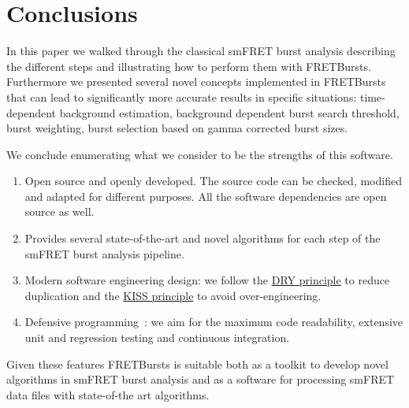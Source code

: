 \section{Conclusions}
\label{sec:conclusions}

In this paper we walked through the classical smFRET burst analysis describing
the different steps and illustrating how to perform them with FRETBursts.
Furthermore we presented several novel concepts implemented in FRETBursts that 
can lead to significantly more accurate results in specific situations: 
time-dependent background estimation, background dependent burst search threshold,
burst weighting, burst selection based on gamma corrected burst sizes. 

We conclude enumerating what we consider to be the strengths
of this software.

\begin{enumerate}
\item Open source and openly developed. The source code can be checked, modified and
adapted for different purposes. All the software dependencies are open source as well.
\item Provides several state-of-the-art and novel algorithms for each step of the 
smFRET burst analysis pipeline. 
\item Modern software engineering design: we follow the \href{http://en.wikipedia.org/wiki/Don\%27t_repeat_yourself}{DRY principle} to reduce duplication and the \href{http://en.wikipedia.org/wiki/KISS_principle}{KISS principle} to avoid over-engineering.
\item Defensive programming~\cite{Prli__2012}: we aim for the maximum code readability,
extensive unit and regression testing and continuous integration.
\end{enumerate}

Given these features FRETBursts is suitable both as a toolkit to develop novel algorithms
in smFRET burst analysis and as a software for processing smFRET data files with
state-of-the art algorithms.
